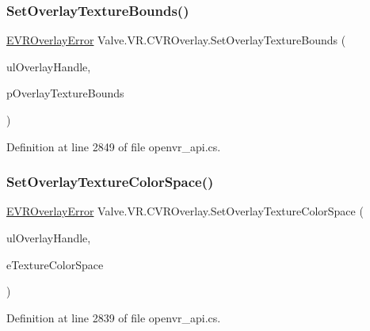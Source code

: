 \subsubsection{\texorpdfstring{SetOverlayTextureBounds()}{SetOverlayTextureBounds()}}
{\footnotesize\ttfamily \mbox{\hyperlink{namespace_valve_1_1_v_r_aaee5c5144f42b7969d45b854f51b0c18}{E\+V\+R\+Overlay\+Error}} Valve.\+V\+R.\+C\+V\+R\+Overlay.\+Set\+Overlay\+Texture\+Bounds (\begin{DoxyParamCaption}\item[{ulong}]{ul\+Overlay\+Handle,  }\item[{ref \mbox{\hyperlink{struct_valve_1_1_v_r_1_1_v_r_texture_bounds__t}{V\+R\+Texture\+Bounds\+\_\+t}}}]{p\+Overlay\+Texture\+Bounds }\end{DoxyParamCaption})}



Definition at line 2849 of file openvr\+\_\+api.\+cs.

\mbox{\label{class_valve_1_1_v_r_1_1_c_v_r_overlay_a3cbb113af32f788ca793a39edee39477}} 
\subsubsection{\texorpdfstring{SetOverlayTextureColorSpace()}{SetOverlayTextureColorSpace()}}
{\footnotesize\ttfamily \mbox{\hyperlink{namespace_valve_1_1_v_r_aaee5c5144f42b7969d45b854f51b0c18}{E\+V\+R\+Overlay\+Error}} Valve.\+V\+R.\+C\+V\+R\+Overlay.\+Set\+Overlay\+Texture\+Color\+Space (\begin{DoxyParamCaption}\item[{ulong}]{ul\+Overlay\+Handle,  }\item[{\mbox{\hyperlink{namespace_valve_1_1_v_r_aeb0fba37ba28d8ca276d7c10f01809ac}{E\+Color\+Space}}}]{e\+Texture\+Color\+Space }\end{DoxyParamCaption})}



Definition at line 2839 of file openvr\+\_\+api.\+cs.

\mbox{\label{class_valve_1_1_v_r_1_1_c_v_r_overlay_a8a03e164747126f2bd2bf28b5f0f1775}} 
